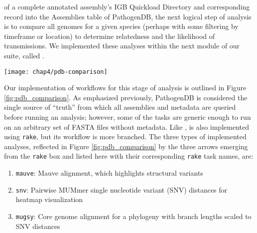  of a complete annotated assembly's IGB Quickload Directory and corresponding record into the Assemblies table of PathogenDB, the next logical step of analysis is to compare all genomes for a given species (perhaps with some filtering by timeframe or location) to determine relatedness and the likelihood of transmissions. We implemented these analyses within the next module of our suite, called \pathogendbcomparison.

\begin{figure*}[htb]
  \centering
  \texttt{[image: chap4/pdb-comparison]}               
  \caption[Outline of steps automated by \pathogendbcomparison]{\textbf{Outline of steps automated by \pathogendbcomparison.} Processes are depicted as boxes, with processes requiring potentially multiple runs indicated as a ``stack.'' An interim file format is depicted as a single arrow, and groups of files as doubled arrows. The pipeline concludes with various outputs being sent to \pathogendbviz for further visualization.}
  \label{fig:pdb_comparison}
\end{figure*}

Our implementation of workflows for this stage of analysis is outlined in Figure \ref{fig:pdb_comparison}. As emphasized previously, PathogenDB is considered the single source of ``truth'' from which all assemblies and metadata are queried before running an analysis; however, some of the tasks are generic enough to run on an arbitrary set of FASTA files without metadata. Like \pathogendbpipeline, \pathogendbcomparison{} is also implemented using \texttt{rake}, but its workflow is more branched. The three types of implemented analyses, reflected in Figure \ref{fig:pdb_comparison} by the three arrows emerging from the \texttt{rake} box and listed here with their corresponding \texttt{rake} task names, are:

\begin{enumerate}[label=\arabic*.,noitemsep,labelindent=2em,leftmargin=!]
\item \verb|mauve|: Mauve alignment, which highlights structural variants
\item \verb|snv|: Pairwise MUMmer single nucleotide variant (SNV) distances for heatmap visualization
\item \verb|mugsy|: Core genome alignment for a phylogeny with branch lengths scaled to SNV distances
\end{enumerate}


